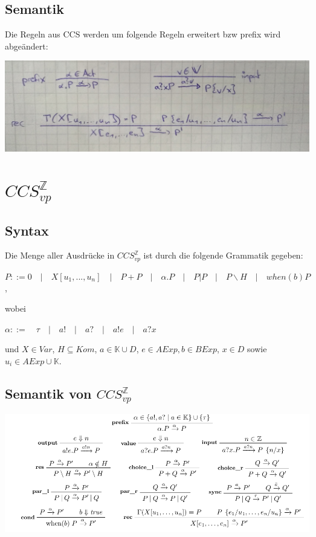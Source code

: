 \documentclass[a4paper,10pt, oneside]{book}
\begin{document}
\subsection*{Semantik}
Die Regeln aus CCS werden um folgende Regeln erweitert bzw prefix wird abgeändert:
\begin{center}
 \includegraphics[scale=0.08]{CCSvp}
\end{center}


\section{$CCS_{vp}^{\mathds{Z}}$}
\subsection*{Syntax}
Die Menge aller Ausdrücke in $CCS_{vp}^{\mathds{Z}}$ ist durch die folgende Grammatik gegeben:
\begin{center}
 $P ::= 0 \quad | \quad X[u_1,...,u_n] \quad | \quad P + P \quad | \quad \alpha.P \quad | \quad P | P \quad | \quad P\backslash H \quad | \quad when(b) P$,
\end{center}
wobei
\begin{center}
 $\alpha ::= \quad \tau \quad | \quad a! \quad | \quad a? \quad | \quad a!e \quad | \quad a?x$
\end{center}
und $X \in Var$, $H \subseteq Kom$, $a \in \mathds{K} \cup D$, $e \in AExp, b \in BExp$, $x \in D$ sowie $u_i \in AExp \cup \mathds{K}$.

\subsection*{Semantik von $CCS_{vp}^{\mathds{Z}}$}
\begin{center}
\includegraphics[scale=0.7]{CCSvpz}
\end{center}
\end{document}
